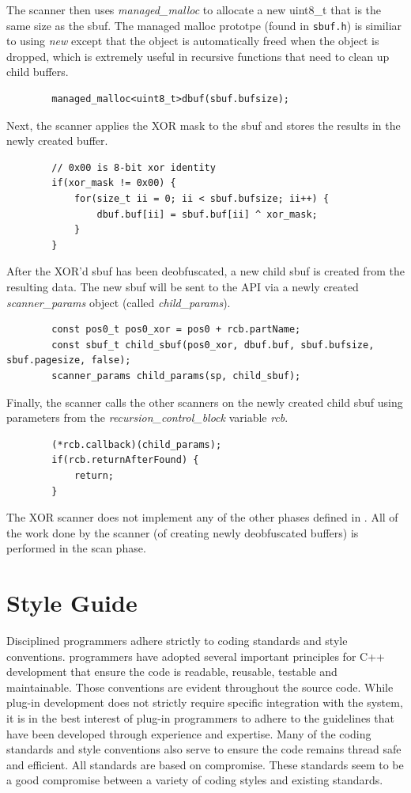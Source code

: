 \documentclass[11pt,fleqn]{article} %
\begin{document}
The scanner then uses \textit{managed\_malloc} to allocate a new uint8\_t that is the same size as the sbuf. The managed malloc prototpe (found in \texttt{sbuf.h}) is similiar to using \textit{new} except that the object is automatically freed when the object is dropped, which is extremely useful in recursive functions that need to clean up child buffers.
\begin{lstlisting}
        managed_malloc<uint8_t>dbuf(sbuf.bufsize);
\end{lstlisting}
Next, the scanner applies the XOR mask to the sbuf and stores the results in the newly created buffer.
\begin{lstlisting}
        // 0x00 is 8-bit xor identity
        if(xor_mask != 0x00) {
            for(size_t ii = 0; ii < sbuf.bufsize; ii++) {
                dbuf.buf[ii] = sbuf.buf[ii] ^ xor_mask;
            }
        }
\end{lstlisting}
After the XOR'd sbuf has been deobfuscated, a new child sbuf is created from the resulting data. The new sbuf will be sent to the API via a newly created \textit{scanner\_params} object (called \textit{child\_params}).
\begin{lstlisting}
        const pos0_t pos0_xor = pos0 + rcb.partName;
        const sbuf_t child_sbuf(pos0_xor, dbuf.buf, sbuf.bufsize, sbuf.pagesize, false);
        scanner_params child_params(sp, child_sbuf);
\end{lstlisting}
Finally, the scanner calls the other scanners on the newly created child sbuf using parameters from the \textit{recursion\_control\_block} variable \textit{rcb}.
\begin{lstlisting}
        (*rcb.callback)(child_params);
        if(rcb.returnAfterFound) {
            return;
        }
\end{lstlisting}
The XOR scanner does not implement any of the other phases defined in \bulk. All of the work done by the scanner (of creating newly deobfuscated buffers) is performed in the scan phase.

\section{Style Guide}
\label{StyleGuide}
Disciplined programmers adhere strictly to coding standards and style conventions. \bulk programmers have adopted several important principles for C++ development that ensure the code is readable, reusable, testable and maintainable. Those conventions are evident throughout the source code. While plug-in development does not strictly require specific integration with the \bulk system, it is in the best interest of plug-in programmers to adhere to the guidelines that have been developed through experience and expertise. Many of the coding standards and style conventions also serve to ensure the code remains thread safe and efficient. All standards are based on compromise. These standards seem to be a good compromise between a variety of coding styles and existing standards.
\end{document}
